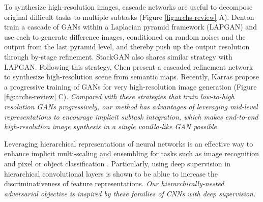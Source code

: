 \documentclass[10pt,twocolumn,letterpaper]{article}
\begin{document}
To synthesize high-resolution images, cascade networks are useful to decompose original difficult tasks to multiple subtasks (Figure \ref{fig:archs-review} A).
Denton \etal \cite{denton2015deep} train a cascade of GANs within a Laplacian pyramid framework (LAPGAN) and use each to generate difference images, conditioned on random noises and the output from the last pyramid level, and thereby push up the output resolution through by-stage refinement. StackGAN also shares similar strategy with LAPGAN. Following this strategy, Chen \etal \cite{chen2017photographic} present a cascaded refinement network to synthesize high-resolution scene from semantic maps. 
Recently, Karras \etal \cite{Karras2017progressive} propose a progressive training of GANs for very high-resolution image generation (Figure \ref{fig:archs-review} C). \textit{Compared with these strategies that train low-to-high resolution GANs progressively, our method has advantages of leveraging mid-level representations to encourage implicit subtask integration, which makes end-to-end high-resolution image synthesis in a single vanilla-like GAN possible.}


Leveraging hierarchical representations of neural networks is an effective way to enhance implicit multi-scaling and ensembling for tasks such as image recognition \cite{lee2015deeply} and pixel or object classification \cite{xie2015holistically,cai2016unified,long2015fully}. Particularly, using deep supervision \cite{lee2015deeply} in hierarchical convolutional layers is shown to be ablue to increase the discriminativeness of feature representations. 
\textit{Our hierarchically-nested adversarial objective is inspired by these families of CNNs with deep supervision. }

%
%
\end{document}
